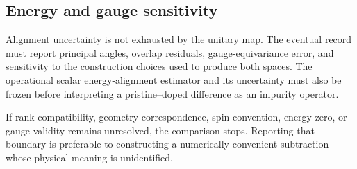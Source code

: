 \subsection{Energy and gauge sensitivity}


Alignment uncertainty is not exhausted by the unitary map. The eventual record
must report principal angles, overlap residuals, gauge-equivariance error, and
sensitivity to the construction choices used to produce both spaces. The
operational scalar energy-alignment estimator and its uncertainty must also be
frozen before interpreting a pristine--doped difference as an impurity
operator.

If rank compatibility, geometry correspondence, spin convention, energy zero,
or gauge validity remains unresolved, the comparison stops. Reporting that
boundary is preferable to constructing a numerically convenient subtraction
whose physical meaning is unidentified.
